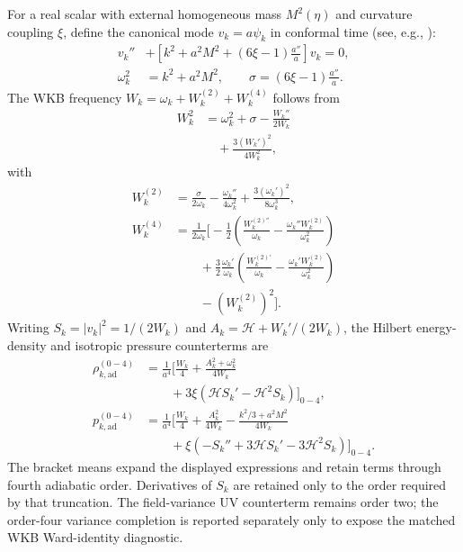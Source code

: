 \documentclass[epj]{svjour}
\begin{document}
For a real scalar with external homogeneous mass $M^2(\eta)$ and curvature
coupling $\xi$, define the canonical mode $v_k=a\psi_k$ in conformal time
(see, e.g., \cite{ParkerFulling1974,BirrellDavies1982}):
\begin{align}
v_k''&+\left[k^2+a^2M^2+(6\xi-1)\frac{a''}{a}\right]v_k=0,\\
\omega_k^2&=k^2+a^2M^2,\qquad
\sigma=(6\xi-1)\frac{a''}{a}.
\end{align}
The WKB frequency $W_k=\omega_k+W_k^{(2)}+W_k^{(4)}$ follows from
\begin{align}
W_k^2&=\omega_k^2+\sigma-\frac{W_k''}{2W_k}\\
&\quad+\frac{3(W_k')^2}{4W_k^2},
\end{align}
with
\begin{align}
W_k^{(2)}
&=\frac{\sigma}{2\omega_k}
-\frac{\omega_k''}{4\omega_k^2}
+\frac{3(\omega_k')^2}{8\omega_k^3},\\
W_k^{(4)}
&=\frac{1}{2\omega_k}\Biggl[
-\frac12\left(
\frac{W_k^{(2)''}}{\omega_k}
-\frac{\omega_k''W_k^{(2)}}{\omega_k^2}
\right)\\
&\qquad+\frac32\frac{\omega_k'}{\omega_k}
\left(
\frac{W_k^{(2)'}}{\omega_k}
-\frac{\omega_k'W_k^{(2)}}{\omega_k^2}
\right)\\
&\qquad-(W_k^{(2)})^2
\Biggr].
\end{align}
Writing $S_k=|v_k|^2=1/(2W_k)$ and
$A_k=\mathcal H+W_k'/(2W_k)$, the Hilbert energy-density and isotropic
pressure counterterms are
\begin{align}
\rho_{k,\mathrm{ad}}^{(0-4)}
&=\frac{1}{a^4}\Biggl[
\frac{W_k}{4}
+\frac{A_k^2+\omega_k^2}{4W_k}\\
&\qquad+3\xi\left(\mathcal H S_k'-\mathcal H^2S_k\right)
\Biggr]_{0-4},\\
p_{k,\mathrm{ad}}^{(0-4)}
&=\frac{1}{a^4}\Biggl[
\frac{W_k}{4}
+\frac{A_k^2}{4W_k}
-\frac{k^2/3+a^2M^2}{4W_k}\\
&\qquad+\xi\left(-S_k''+3\mathcal H S_k'-3\mathcal H^2S_k\right)
\Biggr]_{0-4}.
\end{align}
The bracket means expand the displayed expressions and retain terms
through fourth adiabatic order. Derivatives of $S_k$ are retained only
to the order required by that truncation. The field-variance UV
counterterm remains order two; the order-four variance completion is
reported separately only to expose the matched WKB Ward-identity
diagnostic.
\end{document}
